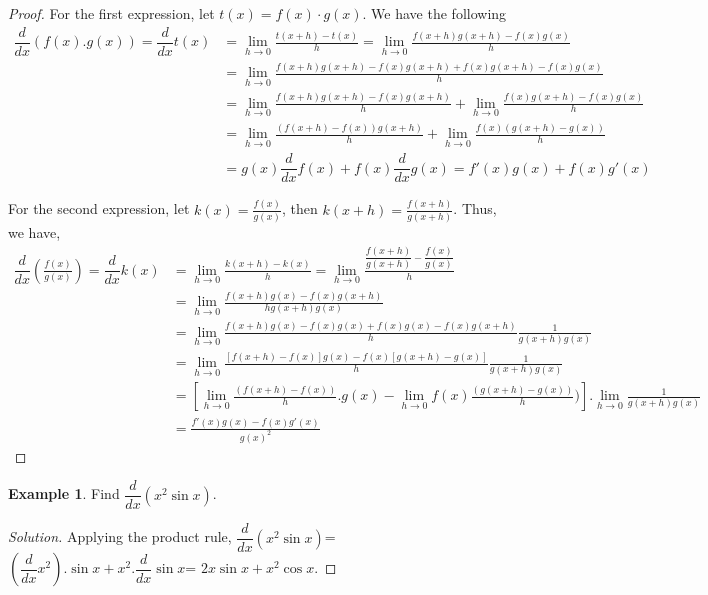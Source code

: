 \documentclass[../../main.tex]{subfiles}
\theoremstyle{definition}
\newtheorem{example}{Example}[section]
\newenvironment{solution}
    {\begin{proof}[Solution]}
    {\end{proof}}
\begin{document}
\begin{proof}
For the first expression, let $t(x)=f(x)\cdot g(x)$. We have the following 
\begin{align*}
\dfrac{d}{dx}({f(x).g(x)}) = \dfrac{d}{dx}t(x) &= \lim_{h \rightarrow 0} \frac {t(x+h)-t(x)}{h} = \lim_{h \rightarrow 0} \frac {f(x+h)g(x+h)-f(x)g(x)}{h} \\ 
&= \lim_{h \rightarrow 0} \frac {f(x+h)g(x+h)-f(x)g(x+h)+f(x)g(x+h)-f(x)g(x)}{h} \\
&= \lim_{h \rightarrow 0}\frac{f(x+h)g(x+h)-f(x)g(x+h)}{h} + \lim_{h \rightarrow 0}\frac{f(x)g(x+h)-f(x)g(x)}{h} \\ 
&= \lim_{h \rightarrow 0}\frac{(f(x+h)-f(x))g(x+h)}{h} + \lim_{h \rightarrow 0}\frac{f(x)(g(x+h)-g(x))}{h} \\ 
&= g(x)\dfrac{d}{dx}f(x) + f(x)\dfrac{d}{dx}g(x) = f'(x)g(x)+f(x)g'(x)
\end{align*}

For the second expression, let $k(x)=\frac{f(x)}{g(x)}$, then $k(x+h)=\frac{f(x+h)}{g(x+h)}$. Thus, we have,
\begin{align*}
    \dfrac{d}{dx}(\frac{f(x)}{g(x)}) = \dfrac{d}{dx} k(x) &= \lim_{h \rightarrow 0} \frac {k(x+h)-k(x)}{h} = \lim_{h \rightarrow 0} \frac {\dfrac{f(x+h)}{g(x+h)}-\dfrac{f(x)}{g(x)}}{h} \\ 
    &= \lim_{h \rightarrow 0} \frac {f(x+h)g(x)-f(x)g(x+h)}{hg(x+h)g(x)} \\
    &= \lim_{h \rightarrow 0} \frac {f(x+h)g(x)-f(x)g(x)+f(x)g(x)-f(x)g(x+h)}{h}{\frac{1}{g(x+h)g(x)}} \\
    &= \lim_{h \rightarrow 0} \frac {\left[f(x+h)-f(x)\right]g(x)-f(x)\left[g(x+h)-g(x)\right]}{h}{\frac{1}{g(x+h)g(x)}} \\
    &= \left[\lim_{h \rightarrow 0} \frac {(f(x+h)-f(x))}{h}.g(x)-\lim_{h\rightarrow 0}f(x)\frac {(g(x+h)-g(x))}{h})\right].\lim_{h\rightarrow 0}{\frac{1}{g(x+h)g(x)}} \\
    &= \frac{f'(x)g(x)-f(x)g'(x)}{g(x)^2}
\end{align*}

\end{proof}

\begin{example}
Find $\dfrac{d}{dx} (x^2 \sin x)$.    
\end{example}

\begin{solution}
Applying the product rule,
$\dfrac{d}{dx} (x^2 \sin x)$= $(\dfrac{d}{dx}x^2).\sin x+x^{2}.\dfrac{d}{dx}\sin x$= $2x \sin x+x^{2}\cos x.$    
\end{solution}
\end{document}
